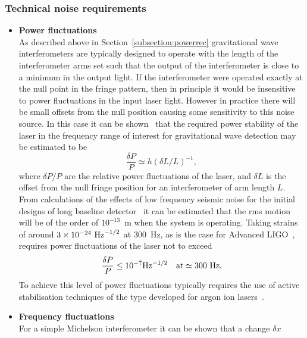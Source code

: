 \documentclass{article}
\begin{document}

\subsubsection{Technical noise requirements}
\label{subsubsection:lasernoise}

\begin{itemize}
\item {\bf Power fluctuations} \\
As described above in Section~\ref{subsection:powerrec} gravitational wave
interferometers are typically designed to operate with the length of the
interferometer arms set such that the output of the interferometer is close to a
minimum in the output light. If the interferometer were operated exactly at the
null point in the fringe pattern, then in principle it would be insensitive to
power fluctuations in the input laser light. However in practice there will be
small offsets from the null position causing some sensitivity to this noise
source.  In this case it can be shown~\cite{Hough} that the required power
stability of the laser in the frequency range of interest for gravitational wave
detection may be estimated to be
%
\begin{equation}
  \frac{\delta P}{P} \simeq h (\delta L/L)^{-1},
  \label{equation:intnoise1}
\end{equation}
%
where $\delta P/P$ are the relative power fluctuations of the laser, and $\delta
L$ is the offset from the null fringe position for an interferometer of arm
length $L$.  From calculations of the effects of low frequency seismic noise for
the initial designs of long baseline detector~\cite{Hough} it can be estimated
that the rms motion will be of the order of $10^{-13}$~m when the system is
operating. Taking strains of around $3 \times 10^{-24}~{\rm Hz}^{-1/2}$ at
300~Hz, as is the case for Advanced LIGO~\cite{Harry:2010}, requires power
fluctuations of
the laser not to exceed
%
\begin{equation}
  \frac{\delta P}{P} \leq 10^{-7} {\rm Hz}^{-1/2} \quad {\rm at}
  \simeq 300 {\rm \ Hz}.
  \label{equation:intnoise2}
\end{equation}
%
To achieve this level of power fluctuations typically requires the use of active
stabilisation techniques of the type developed for argon ion
lasers~\cite{Mangan}.
%
\item {\bf Frequency fluctuations} \\
For a simple Michelson interferometer it can be shown that a change $\delta x$

\end{itemize}
\end{document}
